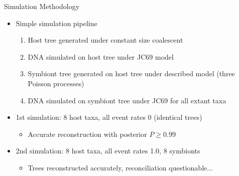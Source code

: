 \documentclass{beamer}
\begin{document}
\begin{frame}{Simulation Methodology}

\begin{itemize}

\item Simple simulation pipeline
\begin{enumerate}
\item Host tree generated under constant size coalescent
\item DNA simulated on host tree under JC69 model
\item Symbiont tree generated on host tree under described model (three Poisson processes)
\item DNA simulated on symbiont tree under JC69 for all extant taxa
\end{enumerate}
\pause
\item 1st simulation: 8 host taxa, all event rates 0 (identical trees)
\begin{itemize}
\item Accurate reconstruction with posterior $P\geq0.99$
\end{itemize}
\pause
\item 2nd simulation: 8 host taxa, all event rates 1.0, 8 symbionts
\begin{itemize}
\item Trees reconstructed accurately, reconciliation questionable...
\end{itemize}

\end{itemize}

\end{frame}
\end{document}
